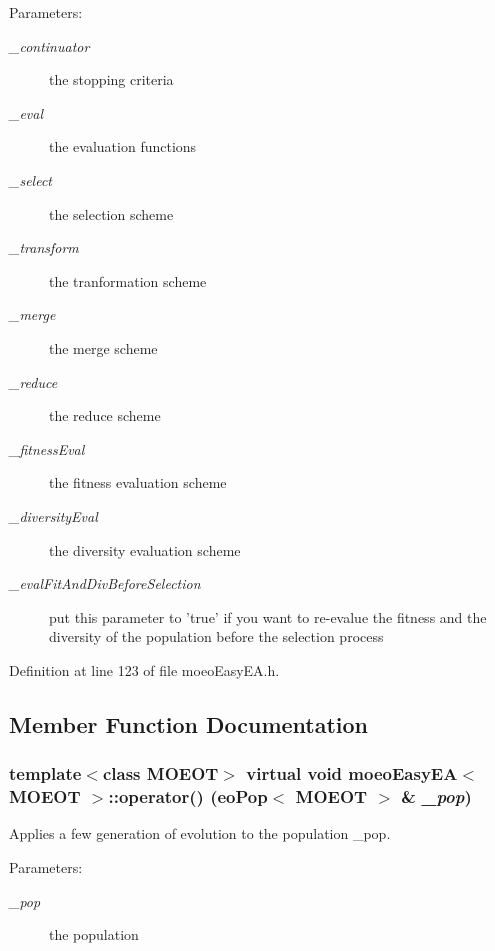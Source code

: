 \begin{Desc}
\item[Parameters:]
\begin{description}
\item[{\em \_\-continuator}]the stopping criteria \item[{\em \_\-eval}]the evaluation functions \item[{\em \_\-select}]the selection scheme \item[{\em \_\-transform}]the tranformation scheme \item[{\em \_\-merge}]the merge scheme \item[{\em \_\-reduce}]the reduce scheme \item[{\em \_\-fitness\-Eval}]the fitness evaluation scheme \item[{\em \_\-diversity\-Eval}]the diversity evaluation scheme \item[{\em \_\-eval\-Fit\-And\-Div\-Before\-Selection}]put this parameter to 'true' if you want to re-evalue the fitness and the diversity of the population before the selection process \end{description}
\end{Desc}


Definition at line 123 of file moeo\-Easy\-EA.h.

\subsection{Member Function Documentation}
\subsubsection{\setlength{\rightskip}{0pt plus 5cm}template$<$class MOEOT$>$ virtual void \bf{moeo\-Easy\-EA}$<$ MOEOT $>$::operator() (\bf{eo\-Pop}$<$ MOEOT $>$ \& {\em \_\-pop})\hspace{0.3cm}{\tt  [inline, virtual]}}\label{classmoeoEasyEA_f18e8fd179fbb2b89f4a59d213317170}


Applies a few generation of evolution to the population \_\-pop. 

\begin{Desc}
\item[Parameters:]
\begin{description}
\item[{\em \_\-pop}]the population \end{description}
\end{Desc}


